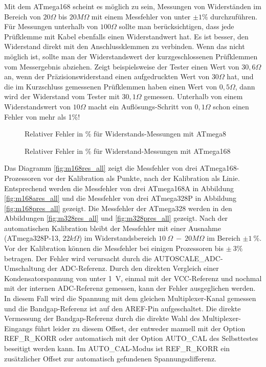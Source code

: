 Mit dem ATmega168 scheint es m\"oglich zu sein, Messungen von Widerst\"anden im
Bereich von \(20\Omega\) bis \(20M\Omega\) mit einem Messfehler von unter \(\pm1\%\) durchzuf\"uhren.
F\"ur Messungen unterhalb von \(100\Omega\) sollte man ber\"ucksichtigen, dass jede Pr\"ufklemme mit Kabel ebenfalls
einen Widerstandwert hat.
Es ist besser, den Widerstand direkt mit den Anschlussklemmen zu verbinden.
Wenn das nicht m\"oglich ist, sollte man der Widerstandswert der kurzgeschlossenen Pr\"ufklemmen vom Messergebnis abziehen.
Zeigt beispielsweise der Tester einen Wert von \(30,6\Omega\) an, wenn der Präzisionswiderstand einen aufgedruckten Wert von \(30\Omega\) hat, 
und die im Kurzschluss gemessenen Pr\"ufklemmen haben einen Wert von \(0,5\Omega\), dann wird der Widerstand vom
Tester mit \(30,1\Omega\) gemessen.
Unterhalb von einem Widerstandswert von \(10\Omega\) macht ein Aufl\"osungs-Schritt von \(0,1\Omega\) schon einen Fehler von mehr als 1\%!

\begin{figure}[H]
\centering

\caption{Relativer Fehler in \% f\"ur Widerstands-Messungen mit ATmega8 }
\label{fig:mega8res}
\end{figure}

\begin{figure}[H]
\centering

\caption{Relativer Fehler in \% f\"ur Widerstand-Messungen mit ATmega168 }
\label{fig:mega168res}
\end{figure}

Das Diagramm \ref{fig:m168res_all} zeigt die Messfehler von drei ATmega168-Prozessoren vor der Kalibration als Punkte, nach der
Kalibration als Linie. Entsprechend werden die Messfehler von drei ATmega168A in Abbildung \ref{fig:m168ares_all} und
die Messfehler von drei ATmega328P in Abbildung \ref{fig:m168pres_all} gezeigt.
Die Messfehler der ATmega328 werden in den Abbildungen \ref{fig:m328res_all} und \ref{fig:m328pres_all} gezeigt.
Nach der automatischen Kalibration bleibt der Messfehler mit einer Ausnahme (ATmega328P-13, \(22 k\Omega\)) im Widerstandsbereich
\(10~\Omega~-~20 M\Omega\) im Bereich \(\pm1~\%\).
Vor der Kalibration k\"onnen die Messfehler bei einigen Prozessoren bis \(\pm~3\%\) betragen.
Der Fehler wird verursacht durch die AUTOSCALE\_ADC-Umschaltung der ADC-Referenz.
Durch den direkten Vergleich einer Kondensatorspannung von unter 1~V, einmal mit der VCC-Referenz und nochmal mit
der internen ADC-Referenz gemessen, kann der Fehler ausgeglichen werden.
In diesem Fall wird die Spannung mit dem gleichen Multiplexer-Kanal gemessen und die Bandgap-Referenz ist auf den AREF-Pin
aufgeschaltet.
Die direkte Vermessung der Bandgap-Referenz durch die direkte Wahl des Multiplexer-Eingangs f\"uhrt leider zu diesem Offset,
der entweder manuell mit der Option REF\_R\_KORR oder automatisch mit der Option AUTO\_CAL des Selbsttestes beseitigt werden kann.
Im AUTO\_CAL-Modus ist REF\_R\_KORR ein zus\"atzlicher Offset zur automatisch gefundenen Spannungsdifferenz.


